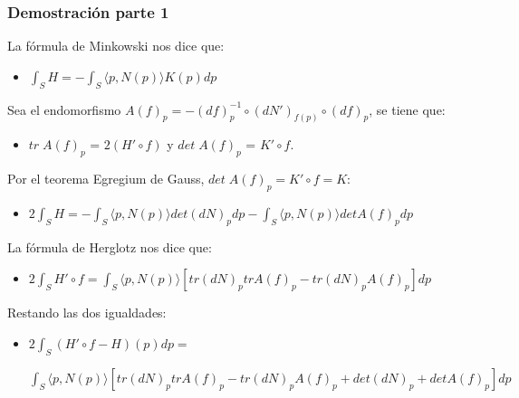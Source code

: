 \documentclass{beamer}
\begin{document}
	\begin{frame}
		\frametitle{Demostración parte 1}
		
		
		La fórmula de Minkowski nos dice que:
		\begin{itemize}
			\item $\int_S H = - \int_S \langle p, N(p) \rangle K(p) dp$
		\end{itemize}
		
		Sea el endomorfismo $A(f)_p = -(df)^{-1}_{p} \circ (dN')_{f(p)} \circ (df)_p$, se tiene que:
		\begin{itemize}
			\item $tr \; A(f)_p$ = $2(H' \circ f)$ y $det \; A(f)_p$ = $K' \circ f$.
		\end{itemize}
		
		Por el teorema Egregium de Gauss, $det \; A(f)_p = K' \circ f = K$:
		
		\begin{itemize}
			\item $2 \int_S H = - \int_S \langle p, N(p) \rangle det(dN)_p dp - \int_S \langle p, N(p) \rangle det A(f)_p dp$
		\end{itemize}
		
		La fórmula de Herglotz nos dice que:
		\begin{itemize}
			\item $2 \int_S H' \circ f = \int_S \langle p, N(p) \rangle [tr(dN)_p trA(f)_p - tr(dN)_p A(f)_p] dp$
		\end{itemize}
		Restando las dos igualdades:
		\begin{itemize}
			\item $2 \int_S (H' \circ f - H)(p) dp = $
			
			$\int_S \langle p, N(p) \rangle [tr(dN)_p trA(f)_p - tr(dN)_p A(f)_p + det(dN)_p + det A(f)_p] dp$
		\end{itemize}
	\end{frame}
	
\end{document}
